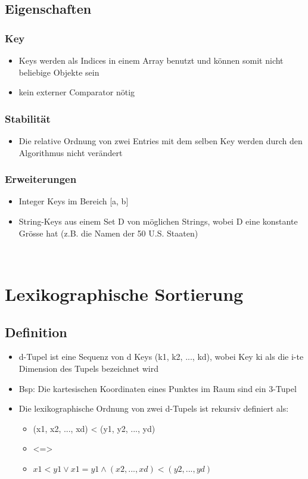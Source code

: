 \subsection{Eigenschaften}
\subsubsection{Key}
\begin{itemize}
    \item Keys werden als Indices in einem Array benutzt und können somit nicht beliebige Objekte sein
    \item kein externer Comparator nötig
\end{itemize}
\subsubsection{Stabilität}
\begin{itemize}
    \item Die relative Ordnung von zwei Entries mit dem selben Key werden durch den Algorithmus nicht verändert
\end{itemize}

\subsubsection{Erweiterungen}
\begin{itemize}
    \item Integer Keys im Bereich [a, b]
    \item String-Keys aus einem Set D von möglichen Strings, wobei D eine konstante Grösse hat (z.B. die Namen der 50 U.S. Staaten)
\end{itemize}


\vfill
$ $
\columnbreak


\section{Lexikographische Sortierung}
\subsection{Definition}
\begin{itemize}
    \item d-Tupel ist eine Sequenz von d Keys (k1, k2, ..., kd), wobei Key ki als die i-te Dimension des Tupels bezeichnet wird
    \item Bsp: Die kartesischen Koordinaten eines Punktes im Raum sind ein 3-Tupel
    \item Die lexikographische Ordnung von zwei d-Tupels ist rekursiv definiert als:
    \begin{itemize}
        \item (x1, x2, ..., xd) < (y1, y2, ..., yd)
        \item <=>
        \item $ x1<y1 \vee  x1=y1 \wedge  (x2,...,xd) < (y2,...,yd) $
    \end{itemize}
\end{itemize}

